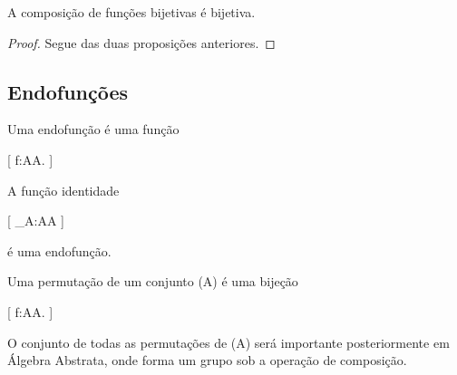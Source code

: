 \documentclass[../../main]{subfiles}
\begin{document}
\begin{prop}
	\label{prop:matematica:funcoes:tipos-de-funcoes:composicao-bijetiva}

	A composição de funções bijetivas é bijetiva.

\end{prop}

\begin{proof}

	Segue das duas proposições anteriores.

\end{proof}

\subsection{Endofunções}

\begin{defn}[Endofunção]
	\label{def:matematica:funcoes:tipos-de-funcoes:endofuncao}

	Uma endofunção é uma função

	[
	f:A\to A.
	]

\end{defn}

\begin{ex}

	A função identidade

		[
			_A:A\to A
		]

	é uma endofunção.

\end{ex}

\begin{defn}[Permutação]
	\label{def:matematica:funcoes:tipos-de-funcoes:permutacao}

	Uma permutação de um conjunto (A) é uma bijeção

	[
	f:A\to A.
	]

\end{defn}

\begin{obs}

	O conjunto de todas as permutações de (A) será importante
	posteriormente em Álgebra Abstrata, onde forma um grupo sob a
	operação de composição.

\end{obs}
\end{document}
